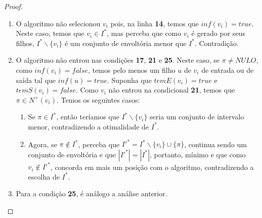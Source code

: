 \begin{proof}
  \begin{enumerate}
    \item O algoritmo não selecionou $v_i$ pois, na linha \textbf{14}, temos que $inf(v_i) = true$. Neste caso, temos que $v_i \in I^*$, mas perceba que como $v_i$ é gerado por seus filhos, $I^*\backslash \{v_i\}$ é um conjunto de envoltória menor que $I^*$. Contradição.
    \item O algoritmo não entrou nas condições \textbf{17}, \textbf{21} e \textbf{25}. Neste caso, se $\pi \neq NULO$, como $inf(v_i) = false$, temos pelo menos um filho $u$ de $v_i$ de entrada ou de saída tal que $inf(u) = true$. Suponha que $temE(v_i) = true$ e $temS(v_i) = false$. Como $v_i$ não entrou na condicional \textbf{21}, temos que $\pi \in N^+(v_i)$. Temos os seguintes casos:
    \begin{enumerate}
      \item Se $\pi \in I^*$, então teríamos que $I^*\backslash \{v_i\}$ seria um conjunto de intervalo menor, contradizendo a otimalidade de $I^*$.
      \item Agora, se $\pi \notin I^*$, perceba que $I'^* = I^*\backslash \{v_i\} \cup \{\pi\}$, continua sendo um conjunto de envoltória e que $|I'^*| = |I^*|$, portanto, mínimo e que como $v_i \notin I'^*$, concorda em mais um posição com o algoritmo, contradizendo a escolha de $I^*$.
    \end{enumerate}

    \item Para a condição \textbf{25}, é análogo a análise anterior.
  \end{enumerate}
\end{proof}
